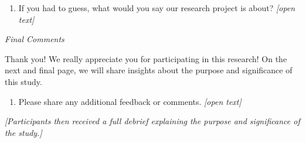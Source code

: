 \documentclass[12pt,notitlepage]{article}
\theoremstyle{plain}
\theoremstyle{plain}
\theoremstyle{definition}
\theoremstyle{definition}
\theoremstyle{assumption}
\theoremstyle{plain}
\theoremstyle{plain}
\theoremstyle{plain}
\theoremstyle{plain}
\theoremstyle{definition}%
\theoremstyle{plain}
\theoremstyle{plain}
\theoremstyle{plain}
\theoremstyle{plain}
\begin{document}
\begin{enumerate}
\item If you had to guess, what would you say our research project is about? \emph{[open text]}
\end{enumerate}

\vspace{12pt}
\emph{Final Comments}

Thank you! We really appreciate you for participating in this research! On the next and final page, we will share insights about the purpose and significance of this study.

\begin{enumerate}
\item Please share any additional feedback or comments. \emph{[open text]}
\end{enumerate}

\textit{[Participants then received a full debrief explaining the purpose and significance of the study.]}
\end{document}
